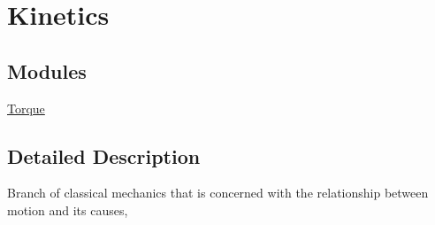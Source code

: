 \hypertarget{group___e_g_x_phys-_kinetics}{}\section{Kinetics}
\label{group___e_g_x_phys-_kinetics}
\subsection*{Modules}
\begin{DoxyCompactItemize}
\item 
\mbox{\hyperlink{group___e_g_x_phys-_kinetics-_torque}{Torque}}
\end{DoxyCompactItemize}


\subsection{Detailed Description}
Branch of classical mechanics that is concerned with the relationship between motion and its causes, 
